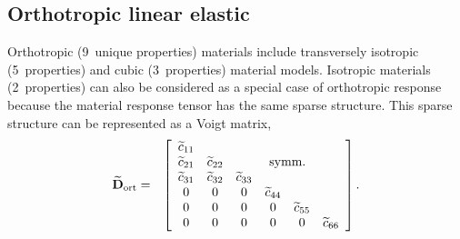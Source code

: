 \documentclass[]             %
{NASA}                       %
\begin{document}
\subsection{Orthotropic linear elastic}

Orthotropic (9~unique properties) materials %
include transversely isotropic (5~properties) and cubic (3~properties) material models. Isotropic materials (2~properties) can also be considered as a special case of orthotropic response because the material response tensor has the same sparse structure. This sparse structure can be represented as a Voigt matrix, %
%
\begin{eqnarray}
\widetilde{\mathbf{D}}_{\mathrm{ort}} & = & \left[\begin{array}{cccccc}
%
\widetilde{c}_{11} & & & & &\\
\widetilde{c}_{21} & \widetilde{c}_{22} & & \multicolumn{2}{c}{\text{symm.}} &\\
\widetilde{c}_{31} & \widetilde{c}_{32} & \widetilde{c}_{33} & & &\\
0 & 0 & 0 & \widetilde{c}_{44} & &\\
0 & 0 & 0 & 0 & \widetilde{c}_{55} &\\
0 & 0 & 0 & 0 & 0 &  \widetilde{c}_{66}
\end{array}\right]\text{.}
\end{eqnarray}
\end{document}
